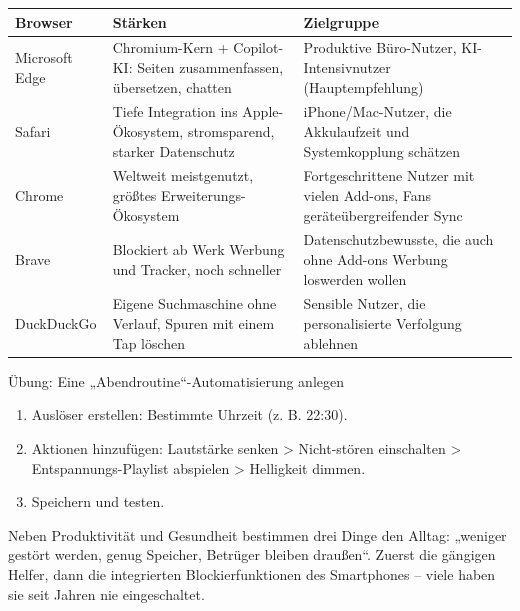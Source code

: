 
\begin{center}
\begin{tabularx}{\linewidth}{|X|X|X|}
\hline
\textbf{Browser} & \textbf{Stärken} & \textbf{Zielgruppe} \tabularnewline
\hline
Microsoft Edge & Chromium-Kern + Copilot-KI: Seiten zusammenfassen, übersetzen, chatten & Produktive Büro-Nutzer, KI-Intensivnutzer (Hauptempfehlung) \tabularnewline
Safari & Tiefe Integration ins Apple-Ökosystem, stromsparend, starker Datenschutz & iPhone/Mac-Nutzer, die Akkulaufzeit und Systemkopplung schätzen \tabularnewline
Chrome & Weltweit meistgenutzt, größtes Erweiterungs-Ökosystem & Fortgeschrittene Nutzer mit vielen Add-ons, Fans geräteübergreifender Sync \tabularnewline
Brave & Blockiert ab Werk Werbung und Tracker, noch schneller & Datenschutzbewusste, die auch ohne Add-ons Werbung loswerden wollen \tabularnewline
DuckDuckGo & Eigene Suchmaschine ohne Verlauf, Spuren mit einem Tap löschen & Sensible Nutzer, die personalisierte Verfolgung ablehnen \tabularnewline
\hline
\end{tabularx}
\end{center}

\begin{tcbpractice}{Übung: Eine „Abendroutine“-Automatisierung anlegen}
\begin{enumerate}
  \item Auslöser erstellen: Bestimmte Uhrzeit (z. B. 22:30).
  \item Aktionen hinzufügen: Lautstärke senken > Nicht-stören einschalten > Entspannungs-Playlist abspielen > Helligkeit dimmen.
  \item Speichern und testen.
\end{enumerate}

\end{tcbpractice}


Neben Produktivität und Gesundheit bestimmen drei Dinge den Alltag: „weniger gestört werden, genug Speicher, Betrüger bleiben draußen“. Zuerst die gängigen Helfer, dann die integrierten Blockierfunktionen des Smartphones – viele haben sie seit Jahren nie eingeschaltet.


